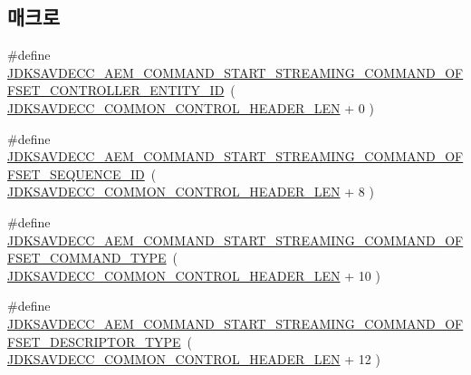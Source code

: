 \subsection*{매크로}
\begin{DoxyCompactItemize}
\item 
\#define \hyperlink{group__command__start__streaming_gadd781d8ba95be11f9273257b9d49dec5}{J\+D\+K\+S\+A\+V\+D\+E\+C\+C\+\_\+\+A\+E\+M\+\_\+\+C\+O\+M\+M\+A\+N\+D\+\_\+\+S\+T\+A\+R\+T\+\_\+\+S\+T\+R\+E\+A\+M\+I\+N\+G\+\_\+\+C\+O\+M\+M\+A\+N\+D\+\_\+\+O\+F\+F\+S\+E\+T\+\_\+\+C\+O\+N\+T\+R\+O\+L\+L\+E\+R\+\_\+\+E\+N\+T\+I\+T\+Y\+\_\+\+ID}~( \hyperlink{group__jdksavdecc__avtp__common__control__header_gaae84052886fb1bb42f3bc5f85b741dff}{J\+D\+K\+S\+A\+V\+D\+E\+C\+C\+\_\+\+C\+O\+M\+M\+O\+N\+\_\+\+C\+O\+N\+T\+R\+O\+L\+\_\+\+H\+E\+A\+D\+E\+R\+\_\+\+L\+EN} + 0 )
\item 
\#define \hyperlink{group__command__start__streaming_ga8e24cd96d7fc4361c92ca503ce27a33f}{J\+D\+K\+S\+A\+V\+D\+E\+C\+C\+\_\+\+A\+E\+M\+\_\+\+C\+O\+M\+M\+A\+N\+D\+\_\+\+S\+T\+A\+R\+T\+\_\+\+S\+T\+R\+E\+A\+M\+I\+N\+G\+\_\+\+C\+O\+M\+M\+A\+N\+D\+\_\+\+O\+F\+F\+S\+E\+T\+\_\+\+S\+E\+Q\+U\+E\+N\+C\+E\+\_\+\+ID}~( \hyperlink{group__jdksavdecc__avtp__common__control__header_gaae84052886fb1bb42f3bc5f85b741dff}{J\+D\+K\+S\+A\+V\+D\+E\+C\+C\+\_\+\+C\+O\+M\+M\+O\+N\+\_\+\+C\+O\+N\+T\+R\+O\+L\+\_\+\+H\+E\+A\+D\+E\+R\+\_\+\+L\+EN} + 8 )
\item 
\#define \hyperlink{group__command__start__streaming_ga196861937aeb4913083fd3b1fde86d97}{J\+D\+K\+S\+A\+V\+D\+E\+C\+C\+\_\+\+A\+E\+M\+\_\+\+C\+O\+M\+M\+A\+N\+D\+\_\+\+S\+T\+A\+R\+T\+\_\+\+S\+T\+R\+E\+A\+M\+I\+N\+G\+\_\+\+C\+O\+M\+M\+A\+N\+D\+\_\+\+O\+F\+F\+S\+E\+T\+\_\+\+C\+O\+M\+M\+A\+N\+D\+\_\+\+T\+Y\+PE}~( \hyperlink{group__jdksavdecc__avtp__common__control__header_gaae84052886fb1bb42f3bc5f85b741dff}{J\+D\+K\+S\+A\+V\+D\+E\+C\+C\+\_\+\+C\+O\+M\+M\+O\+N\+\_\+\+C\+O\+N\+T\+R\+O\+L\+\_\+\+H\+E\+A\+D\+E\+R\+\_\+\+L\+EN} + 10 )
\item 
\#define \hyperlink{group__command__start__streaming_gabb27b4fffc256a2d75e42b5084ba543d}{J\+D\+K\+S\+A\+V\+D\+E\+C\+C\+\_\+\+A\+E\+M\+\_\+\+C\+O\+M\+M\+A\+N\+D\+\_\+\+S\+T\+A\+R\+T\+\_\+\+S\+T\+R\+E\+A\+M\+I\+N\+G\+\_\+\+C\+O\+M\+M\+A\+N\+D\+\_\+\+O\+F\+F\+S\+E\+T\+\_\+\+D\+E\+S\+C\+R\+I\+P\+T\+O\+R\+\_\+\+T\+Y\+PE}~( \hyperlink{group__jdksavdecc__avtp__common__control__header_gaae84052886fb1bb42f3bc5f85b741dff}{J\+D\+K\+S\+A\+V\+D\+E\+C\+C\+\_\+\+C\+O\+M\+M\+O\+N\+\_\+\+C\+O\+N\+T\+R\+O\+L\+\_\+\+H\+E\+A\+D\+E\+R\+\_\+\+L\+EN} + 12 )
\item 

\end{DoxyCompactItemize}
